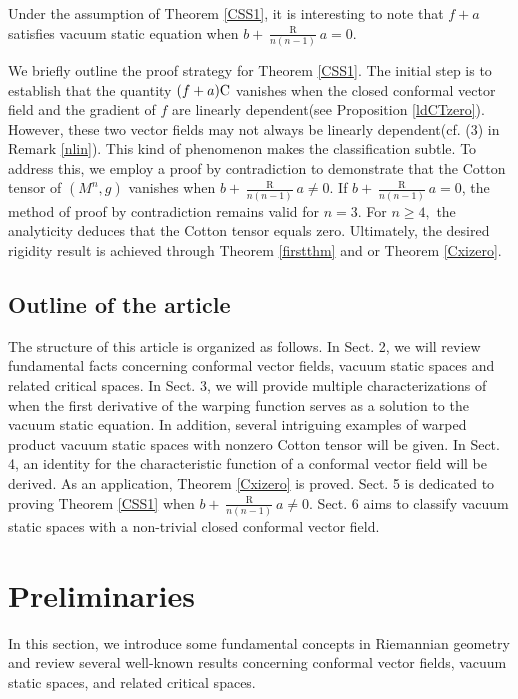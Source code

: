 \documentclass[10pt,leqno,oneside]{amsart}
\begin{document}
          Under the assumption of Theorem \ref{CSS1}, it is interesting to note that $f+a$ satisfies vacuum static equation when $b+\frac{\operatorname R}{n(n-1)}a=0.$

          We briefly outline the proof strategy for Theorem \ref{CSS1}. The initial step is to establish that the quantity $(f+a){\rm C}$ vanishes when the closed conformal vector field and the gradient of $f$ are linearly dependent(see Proposition \ref{ldCTzero}). However, these two vector fields may not always be linearly dependent(cf. (3) in Remark \ref{nlin}). This kind of phenomenon makes the classification subtle. To address this, we employ a proof by contradiction to demonstrate that the Cotton tensor of \((M^n,g)\) vanishes when \(b+\frac{\operatorname{R}}{n(n-1)}a\neq 0\). If \(b+\frac{\operatorname{R}}{n(n-1)}a=0\), the method of proof by contradiction remains valid for $n=3$. For $n\ge4,$ the analyticity deduces that the Cotton tensor equals zero. Ultimately, the desired rigidity result is achieved through Theorem \ref{firstthm} and \cite[Proposition D4]{Lafontaine1983} or Theorem \ref{Cxizero}.




\subsection{Outline of the article}
            The structure of this article is organized as follows. In Sect. 2, we will review fundamental facts concerning conformal vector fields, vacuum static spaces and related critical spaces. In Sect. 3, we will provide multiple characterizations of when the first derivative of the warping function serves as a solution to the vacuum static equation. In addition, several intriguing examples of warped product vacuum static spaces with nonzero Cotton tensor will be given. In Sect. 4, an identity for the characteristic function of a conformal vector field will be derived. As an application, Theorem \ref{Cxizero} is proved. Sect. 5 is dedicated to proving Theorem \ref{CSS1} when $b+\frac{\operatorname R}{n(n-1)}a\neq0.$ Sect. 6 aims to classify vacuum static spaces with a non-trivial closed conformal vector field.



  \section{Preliminaries}
           In this section, we introduce some fundamental concepts in Riemannian geometry and review several well-known results concerning conformal vector fields, vacuum static spaces, and related critical spaces.
\end{document}
